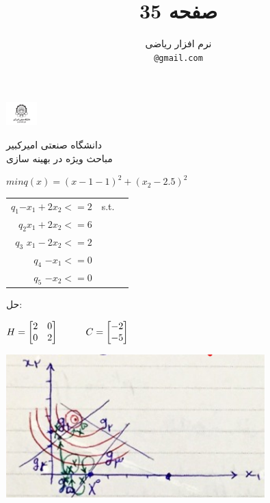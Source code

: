 \documentclass{article}
\title{صفحه 35}
\author{%

  نرم افزار ریاضی\\

  \texttt{@gmail.com} \\
}
\begin{document}
\baselineskip=0.7cm

\begin{minipage}{0.1\textwidth}%
\includegraphics[width=1.2cm]{Amirkabir.jpg}
\end{minipage}%
\hfill%
\begin{minipage}{0.9\textwidth}\raggedleft
دانشگاه صنعتی امیرکبیر\\
مباحث ویژه در بهینه سازی\\
\end{minipage}

\makepertitle
\begin{flushleft}
$min  q(x)=(x-1 - 1)^2+(x_2 - 2.5)^2$\\
  
\begin{tabular}{ r | c  l }
$q_1$\hspace{5mm}$-x_1+2x_2<=2$   &   s.t.  \\
$q_2$\hspace{5mm}$x_1+2x_2<=6 $&\\
$q_3$\hspace{5mm} $x_1-2x_2<=2$ &\\
$q_4$\hspace{5mm}  $-x_1<=0$  &\\
$q_5$\hspace{5mm}   $-x_2<=0$  &\\

\end{tabular}


\end{flushleft}
حل:
\begin{flushleft}
$H=
\begin{bmatrix}
2 & 0\\
0 & 2
\end{bmatrix}
\hspace{10mm}
C=
\begin{bmatrix}
-2\\
-5
\end{bmatrix}$
\end{flushleft}
\begin{flushleft}
\includegraphics[width=10cm]{Diagram.png}\\
\end{flushleft}
\end{document}
